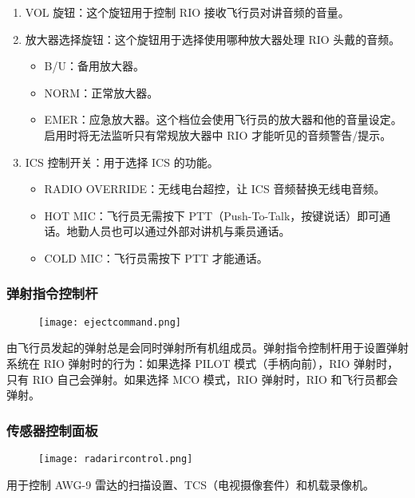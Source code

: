 \begin{enumerate}
  \item VOL 旋钮：这个旋钮用于控制 RIO 接收飞行员对讲音频的音量。
  \item 放大器选择旋钮：这个旋钮用于选择使用哪种放大器处理 RIO 头戴的音频。
  \begin{itemize}
    \item B/U：备用放大器。
    \item NORM：正常放大器。
    \item EMER：应急放大器。这个档位会使用飞行员的放大器和他的音量设定。启用时将无法监听只有常规放大器中 RIO 才能听见的音频警告/提示。
  \end{itemize}
  \item ICS 控制开关：用于选择 ICS 的功能。
  \begin{itemize}
    \item RADIO OVERRIDE：无线电台超控，让 ICS 音频替换无线电音频。
    \item HOT MIC：飞行员无需按下 PTT（Push-To-Talk，按键说话）即可通话。地勤人员也可以通过外部对讲机与乘员通话。
    \item COLD MIC：飞行员需按下 PTT 才能通话。
  \end{itemize}
\end{enumerate}

\subsubsection{弹射指令控制杆}
\begin{figure}[htb]
  \center
  \texttt{[image: ejectcommand.png]}
\end{figure}
由飞行员发起的弹射总是会同时弹射所有机组成员。弹射指令控制杆用于设置弹射系统在 RIO 弹射时的行为：如果选择 PILOT 模式（手柄向前），RIO 弹射时，只有 RIO 自己会弹射。如果选择 MCO 模式，RIO 弹射时，RIO 和飞行员都会弹射。

\subsubsection{传感器控制面板}
\begin{figure}[htb]
  \center
  \texttt{[image: radarircontrol.png]}
\end{figure}
用于控制 AWG-9 雷达的扫描设置、TCS（电视摄像套件）和机载录像机。

